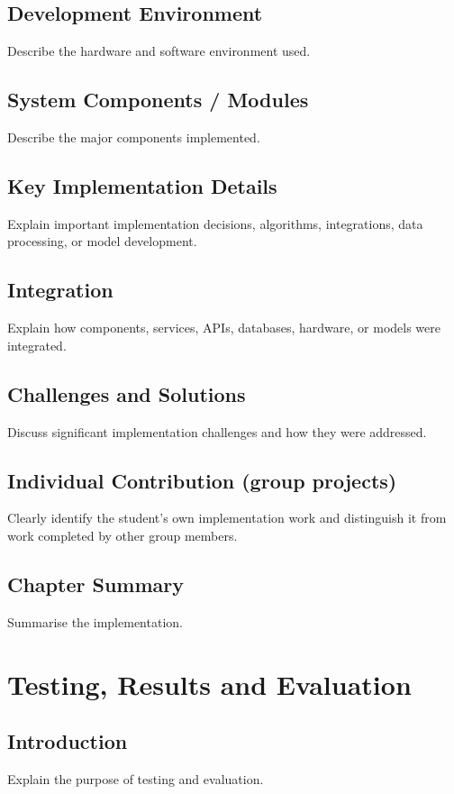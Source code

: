 \documentclass[12pt,a4paper]{report}
\begin{document}
\section{Development Environment}
Describe the hardware and software environment used.

\section{System Components / Modules}
Describe the major components implemented.

\section{Key Implementation Details}
Explain important implementation decisions, algorithms, integrations, data processing, or model development.

\section{Integration}
Explain how components, services, APIs, databases, hardware, or models were integrated.

\section{Challenges and Solutions}
Discuss significant implementation challenges and how they were addressed.

\section{Individual Contribution (group projects)}
Clearly identify the student's own implementation work and distinguish it from work completed by other group members.

\section{Chapter Summary}
Summarise the implementation.

\chapter{Testing, Results and Evaluation}

\section{Introduction}
Explain the purpose of testing and evaluation.
\end{document}
